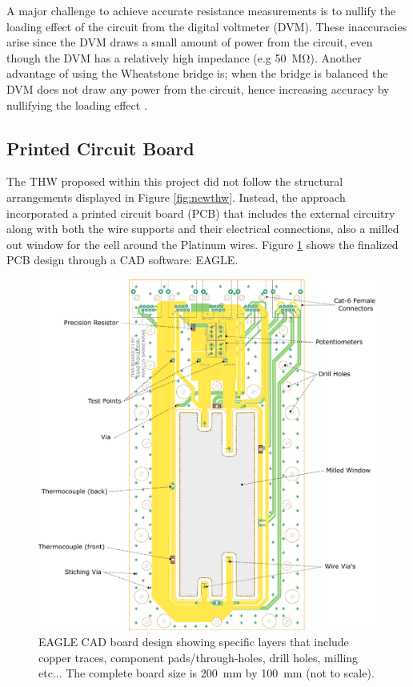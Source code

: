 \documentclass[12pt,MEng]{UoAThesis}
\begin{document}
 A major challenge to achieve accurate resistance measurements is to nullify the loading effect of the circuit from the digital voltmeter (DVM). These inaccuracies arise since the DVM draws a small amount of power from the circuit, even though the DVM has a relatively high impedance (e.g \SI{50}{\mega\ohm}). Another advantage of using the Wheatstone bridge is; when the bridge is balanced the DVM does not draw any power from the circuit, hence increasing accuracy by nullifying the loading effect \cite{wb}. 

\subsection{Printed Circuit Board}

The THW proposed within this project did not follow the structural arrangements displayed in Figure \ref{fig:newthw}. Instead, the approach incorporated a printed circuit board (PCB) that includes the external circuitry along with both the wire supports and their electrical connections, also a milled out window for the cell around the Platinum wires. Figure \ref{fig:eagle} shows the finalized PCB design through a CAD software: EAGLE.

\begin{figure}[htp]
  \centering
  \includegraphics[clip,width=1\linewidth]{figures/eaglesch.pdf}
  \caption{\label{fig:eagle} EAGLE CAD board design showing specific layers that include copper traces, component pads/through-holes, drill holes, milling etc... The complete board size is \SI{200}{\milli\meter} by \SI{100}{\milli\meter} (not to scale).}
\end{figure}
\end{document}
